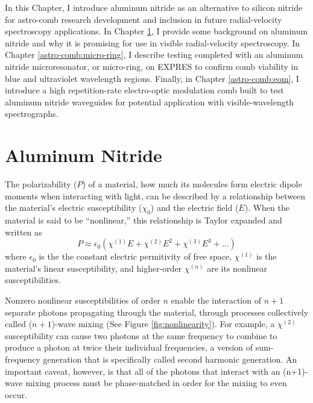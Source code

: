 In this Chapter, I introduce aluminum nitride as an alternative to silicon nitride for astro-comb research development and inclusion in future radial-velocity spectroscopy applications. In Chapter \ref{astro-comb:aln}, I provide some background on aluminum nitride and why it is promising for use in visible radial-velocity spectroscopy. In Chapter \ref{astro-comb:micro-ring}, I describe testing completed with an aluminum nitride microresonator, or micro-ring, on EXPRES to confirm comb viability in blue and ultraviolet wavelength regions. Finally, in Chapter \ref{astro-comb:eom}, I introduce a high repetition-rate electro-optic modulation comb built to test aluminum nitride waveguides for potential application with visible-wavelength spectrographs.

\section{Aluminum Nitride} \label{astro-comb:aln}

The polarizability ($P$) of a material, how much its molecules form electric dipole moments when interacting with light, can be described by a relationship between the material's electric susceptibility ($\chi_0$) and the electric field ($E$). When the material is said to be ``nonlinear,'' this relationship is Taylor expanded and written as
\begin{equation}
    P \approx \epsilon_0 \left( \chi^{(1)} E + \chi^{(2)} E^2 + \chi^{(3)} E^3 + ... \right)
    \label{eq:polarizability}
\end{equation}
where $\epsilon_0$ is the the constant electric permitivity of free space, $\chi^{(1)}$ is the material's linear susceptibility, and higher-order $\chi^{(n)}$ are its nonlinear susceptibilities. 

Nonzero nonlinear susceptibilities of order $n$ enable the interaction of $n+1$ separate photons propagating through the material, through processes collectively called ($n+1$)-wave mixing (See Figure \ref{fig:nonlinearity}). For example, a $\chi^{(2)}$ susceptibility can cause two photons at the same frequency to combine to produce a photon at twice their individual frequencies, a version of sum-frequency generation that is specifically called second harmonic generation. An important caveat, however, is that all of the photons that interact with an (n+1)-wave mixing process must be phase-matched in order for the mixing to even occur.

